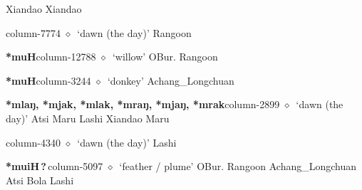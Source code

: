          Xiandao 
\hspace{1ex}
         Xiandao 
  \item {\footnotesize \textbf{}}{\tiny column-7774}
         $\diamond$~`dawn (the day)'
         Rangoon 
  \item {\footnotesize \textbf{*muH}}{\tiny column-12788}
         $\diamond$~`willow'
         OBur. 
\hspace{1ex}
         Rangoon 
  \item {\footnotesize \textbf{*muH}}{\tiny column-3244}
         $\diamond$~`donkey'
         Achang\_Longchuan 
  \item {\footnotesize \textbf{*mlaŋ, *mjak, *mlak, *mraŋ, *mjaŋ, *mrak}}{\tiny column-2899}
         $\diamond$~`dawn (the day)'
         Atsi 
\hspace{1ex}
         Maru 
\hspace{1ex}
         Lashi 
\hspace{1ex}
         Xiandao 
\hspace{1ex}
         Maru 
  \item {\footnotesize \textbf{}}{\tiny column-4340}
         $\diamond$~`dawn (the day)'
         Lashi 
  \item {\footnotesize \textbf{*muiH\,?\,}}{\tiny column-5097}
         $\diamond$~`feather / plume'
         OBur. 
\hspace{1ex}
         Rangoon 
\hspace{1ex}
         Achang\_Longchuan 
\hspace{1ex}
         Atsi 
\hspace{1ex}
         Bola 
\hspace{1ex}
         Lashi 
